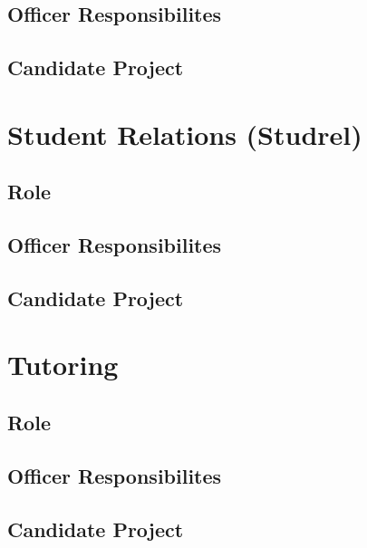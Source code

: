 \documentclass[11pt, article, oneside]{memoir}
\begin{document}
    \subsection{Officer Responsibilites}

    \subsection{Candidate Project}


    \bigbreak

    
    \section{Student Relations (Studrel)}
    \subsection{Role}

    \subsection{Officer Responsibilites}

    \subsection{Candidate Project}


    \bigbreak

    
    \section{Tutoring}
    \subsection{Role}

    \subsection{Officer Responsibilites}

    \subsection{Candidate Project}

    
    \bigbreak
    


    \newpage
\end{document}
